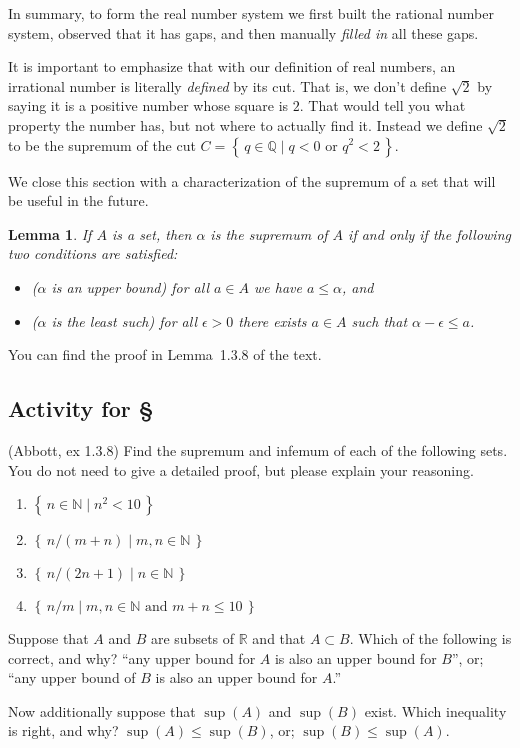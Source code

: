 \documentclass[11pt,oneside]{amsbook}
\newcommand{\set}[1]{\left\{\,#1\,\right\}}
\newcommand{\N}{\mathbb N}
\newcommand{\Q}{\mathbb Q}
\newcommand{\R}{\mathbb R}
\theoremstyle{definition}
\theoremstyle{plain}
\newtheorem{lemma}[theorem]{Lemma}
\theoremstyle{definition}
\theoremstyle{remark}
\numberwithin{equation}{section}
\numberwithin{figure}{section}
\newcounter{activityitem}
\newenvironment{activity}{\begin{list}{\arabic{activityitem}.}{\usecounter{activityitem}\setlength{\itemsep}{.2in}}}{\end{list}}
\begin{document}
In summary, to form the real number system we first built the rational number system, observed that it has gaps, and then manually \emph{filled in} all these gaps.

It is important to emphasize that with our definition of real numbers, an irrational number is literally \emph{defined} by its cut. That is, we don't define $\sqrt2$ by saying it is a positive number whose square is $2$. That would tell you what property the number has, but not where to actually find it. Instead we define $\sqrt2$ to be the supremum of the cut $C=\set{q\in\Q\mid q<0\text{ or }q^2<2}$.

We close this section with a characterization of the supremum of a set that will be useful in the future.

\begin{lemma}
  If $A$ is a set, then $\alpha$ is the supremum of $A$ if and only if the following two conditions are satisfied:
  \begin{itemize}
  \item ($\alpha$ is an upper bound) for all $a\in A$ we have $a\leq\alpha$, and
  \item ($\alpha$ is the least such) for all $\epsilon>0$ there exists $a\in A$ such that $\alpha-\epsilon\leq a$.
  \end{itemize}
\end{lemma}

You can find the proof in Lemma~1.3.8 of the text.

\newpage
\subsection*{Activity for \S \thesection}

\begin{activity}
  \item (Abbott, ex 1.3.8) Find the supremum and infemum of each of the following sets. You do not need to give a detailed proof, but please explain your reasoning.
  \begin{enumerate}\itemsep.5in
    \item $\set{n\in\N\mid n^2<10}$
    \item $\set{n/(m+n)\mid m,n\in\N}$
    \item $\set{n/(2n+1)\mid n\in\N}$
    \item $\set{n/m\mid m,n\in\N\text{ and }m+n\leq10}$
    \vspace{.5in}
  \end{enumerate}
  \item Suppose that $A$ and $B$ are subsets of $\R$ and that $A\subset B$.  Which of the following is correct, and why? ``any upper bound for $A$ is also an upper bound for $B$'', or; ``any upper bound of $B$ is also an upper bound for $A$.''

  Now additionally suppose that $\sup(A)$ and $\sup(B)$ exist.  Which inequality is right, and why? $\sup(A)\leq\sup(B)$, or; $\sup(B)\leq\sup(A)$.
\end{activity}
\end{document}
